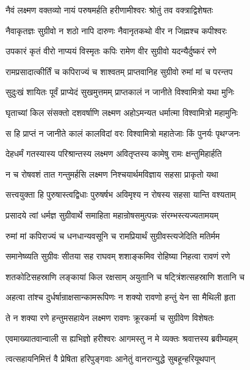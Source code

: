 \twolineshloka
{नैवं लक्ष्मण वक्तव्यो नायं परुषमर्हति}
{हरीणामीश्वरः श्रोतुं तव वक्त्राद्विशेषतः} %

\twolineshloka
{नैवाकृतज्ञः सुग्रीवो न शठो नापि दारुणः}
{नैवानृतकथो वीर न जिह्मश्च कपीश्वरः} %

\twolineshloka
{उपकारं कृतं वीरो नाप्ययं विस्मृतः कपिः}
{रामेण वीर सुग्रीवो यदन्यैर्दुष्करं रणे} %

\twolineshloka
{रामप्रसादात्कीर्तिं च कपिराज्यं च शाश्वतम्}
{प्राप्तवानिह सुग्रीवो रुमां मां च परन्तप} %

\twolineshloka
{सुदुःखं शायितः पूर्वं प्राप्येदं सुखमुत्तमम्}
{प्राप्तकालं न जानीते विश्वामित्रो यथा मुनिः} %

\twolineshloka
{घृताच्यां किल संसक्तो दशवर्षाणि लक्ष्मण}
{अहोऽमन्यत धर्मात्मा विश्वामित्रो महामुनिः} %

\twolineshloka
{स हि प्राप्तं न जानीते कालं कालविदां वरः}
{विश्वामित्रो महातेजाः किं पुनर्यः पृथग्जनः} %

\twolineshloka
{देहधर्मं गतस्यास्य परिश्रान्तस्य लक्ष्मण}
{अवितृप्तस्य कामेषु रामः क्षन्तुमिहार्हति} %

\twolineshloka
{न च रोषवशं तात गन्तुमर्हसि लक्ष्मण}
{निश्चयार्थमविज्ञाय सहसा प्राकृतो यथा} %

\twolineshloka
{सत्त्वयुक्ता हि पुरुषास्त्वद्विधाः पुरुषर्षभ}
{अविमृश्य न रोषस्य सहसा यान्ति वश्यताम्} %

\twolineshloka
{प्रसादये त्वां धर्मज्ञ सुग्रीवार्थे समाहिता}
{महान्रोषसमुत्पन्नः संरम्भस्त्यज्यतामयम्} %

\twolineshloka
{रुमां मां कपिराज्यं च धनधान्यवसूनि च}
{रामप्रियार्थं सुग्रीवस्त्यजेदिति मतिर्मम} %

\twolineshloka
{समानेष्व्यति सुग्रीवः सीतया सह राघवम्}
{शशाङ्कमिव रोहिष्या निहत्वा रावणं रणे} %

\twolineshloka
{शतकोटिसहस्राणि लङ्कायां किल रक्षसाम्}
{अयुतानि च षट्त्रिंशत्सहस्राणि शतानि च} %

\twolineshloka
{अहत्वा तांश्च दुर्धर्षान्राक्षसान्कामरूपिणः}
{न शक्यो रावणो हन्तुं येन सा मैथिली हृता} %

\twolineshloka
{ते न शक्या रणे हन्तुमसहायेन लक्ष्मण}
{रावणः क्रूरकर्मा च सुग्रीवेण विशेषतः} %

\twolineshloka
{एवमाख्यातवान्वाली स ह्यभिज्ञो हरीश्वरः}
{आगमस्तु न मे व्यक्तः श्रवात्तस्य ब्रवीम्यहम्} %

\twolineshloka
{त्वत्सहायनिमित्तं वै प्रेषिता हरिपुङ्गवाः}
{आनेतुं वानरान्युद्धे सुबहून्हरियूथपान्} %

